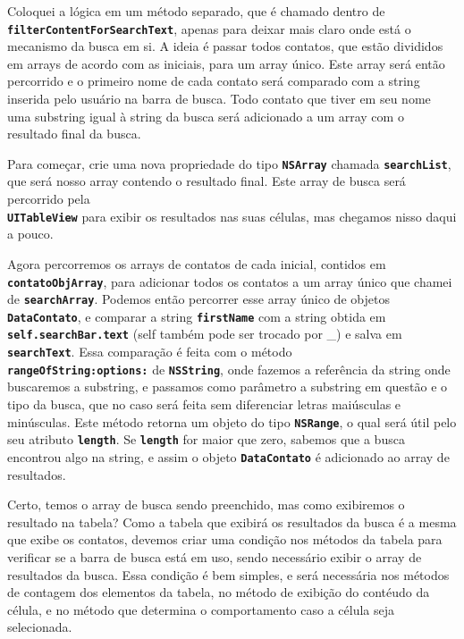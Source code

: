 \documentclass[a4paper,12pt,brazil,oneside]{book}
\begin{document}
Coloquei a lógica em um método separado, que é chamado dentro de\\
\texttt{\textbf{filterContentForSearchText}}, apenas para deixar mais claro onde está o mecanismo da busca em si. A ideia é passar todos contatos, que estão divididos em arrays de acordo com as iniciais, para um array único. Este array será então percorrido e o primeiro nome de cada contato será comparado com a string inserida pelo usuário na barra de busca. Todo contato que tiver em seu nome uma substring igual à string da busca será adicionado a um array com o resultado final da busca.

Para começar, crie uma nova propriedade do tipo \texttt{\textbf{NSArray}} chamada \texttt{\textbf{searchList}}, que será nosso array contendo o resultado final. Este array de busca será percorrido pela\\
\texttt{\textbf{UITableView}} para exibir os resultados nas suas células, mas chegamos nisso daqui a pouco.

Agora percorremos os arrays de contatos de cada inicial, contidos em \texttt{\textbf{contatoObjArray}}, para adicionar todos os contatos a um array único que chamei de \texttt{\textbf{searchArray}}. Podemos então percorrer esse array único de objetos \texttt{\textbf{DataContato}}, e comparar a string \texttt{\textbf{firstName}} com a string obtida em \texttt{\textbf{self.searchBar.text}} (self também pode ser trocado por \_) e salva em \texttt{\textbf{searchText}}. Essa comparação é feita com o método\\
\texttt{\textbf{rangeOfString:options:}} de \texttt{\textbf{NSString}}, onde fazemos a referência da string onde buscaremos a substring, e passamos como parâmetro a substring em questão e o tipo da busca, que no caso será feita sem diferenciar letras maiúsculas e minúsculas. Este método retorna um objeto do tipo \texttt{\textbf{NSRange}}, o qual será útil pelo seu atributo \texttt{\textbf{length}}. Se \texttt{\textbf{length}} for maior que zero, sabemos que a busca encontrou algo na string, e assim o objeto \texttt{\textbf{DataContato}} é adicionado ao array de resultados.

Certo, temos o array de busca sendo preenchido, mas como exibiremos o resultado na tabela? Como a tabela que exibirá os resultados da busca é a mesma que exibe os contatos, devemos criar uma condição nos métodos da tabela para verificar se a barra de busca está em uso, sendo necessário exibir o array de resultados da busca. Essa condição é bem simples, e será necessária nos métodos de contagem dos elementos da tabela, no método de exibição do contéudo da célula, e no método que determina o comportamento caso a célula seja selecionada.
\end{document}
